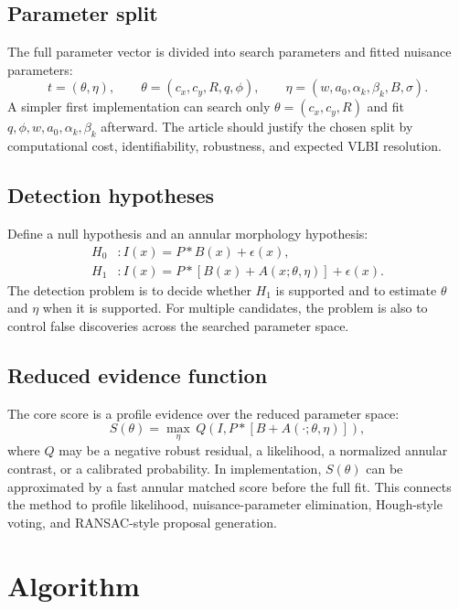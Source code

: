 \documentclass[11pt]{article}
\begin{document}
\subsection{Parameter split}
The full parameter vector is divided into search parameters and fitted nuisance parameters:
\begin{equation}
    t=(\theta,\eta), \qquad \theta=(c_x,c_y,R,q,\phi), \qquad \eta=(w,a_0,\alpha_k,\beta_k,B,\sigma).
\end{equation}
A simpler first implementation can search only $\theta=(c_x,c_y,R)$ and fit $q,\phi,w,a_0,\alpha_k,\beta_k$ afterward. The article should justify the chosen split by computational cost, identifiability, robustness, and expected VLBI resolution.

\subsection{Detection hypotheses}
Define a null hypothesis and an annular morphology hypothesis:
\begin{align}
    H_0 &: I(x)=P\ast B(x)+\epsilon(x), \\
    H_1 &: I(x)=P\ast[B(x)+A(x;\theta,\eta)]+\epsilon(x).
\end{align}
The detection problem is to decide whether $H_1$ is supported and to estimate $\theta$ and $\eta$ when it is supported. For multiple candidates, the problem is also to control false discoveries across the searched parameter space.

\subsection{Reduced evidence function}
The core score is a profile evidence over the reduced parameter space:
\begin{equation}
    S(\theta)=\max_{\eta}\, Q\left(I, P\ast [B+A(\cdot;\theta,\eta)]\right),
\end{equation}
where $Q$ may be a negative robust residual, a likelihood, a normalized annular contrast, or a calibrated probability. In implementation, $S(\theta)$ can be approximated by a fast annular matched score before the full fit. This connects the method to profile likelihood, nuisance-parameter elimination, Hough-style voting, and RANSAC-style proposal generation.

\section{Algorithm}
\end{document}
